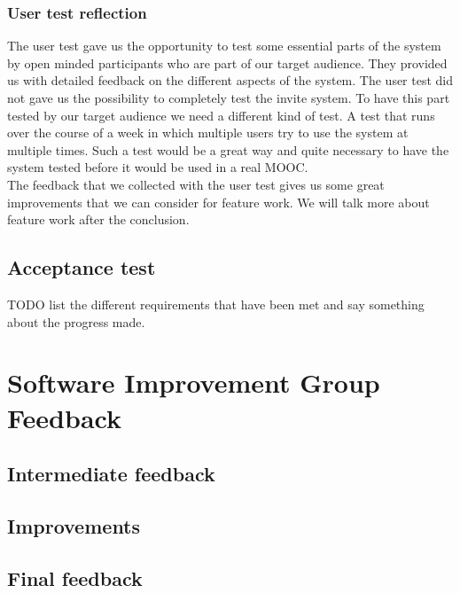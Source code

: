 \subsubsection{User test reflection}
The user test gave us the opportunity to test some essential parts of the system by open minded participants who are part of our target audience.
They provided us with detailed feedback on the different aspects of the system.
The user test did not gave us the possibility to completely test the invite system.
To have this part tested by our target audience we need a different kind of test.
A test that runs over the course of a week in which multiple users try to use the system at multiple times.
Such a test would be a great way and quite necessary to have the system tested before it would be used in a real MOOC.\\
The feedback that we collected with the user test gives us some great improvements that we can consider for feature work.
We will talk more about feature work after the conclusion.

\subsection{Acceptance test}
TODO list the different requirements that have been met and say something about the progress made.

\section{Software Improvement Group Feedback}
\subsection{Intermediate feedback}
\subsection{Improvements}
\subsection{Final feedback}


